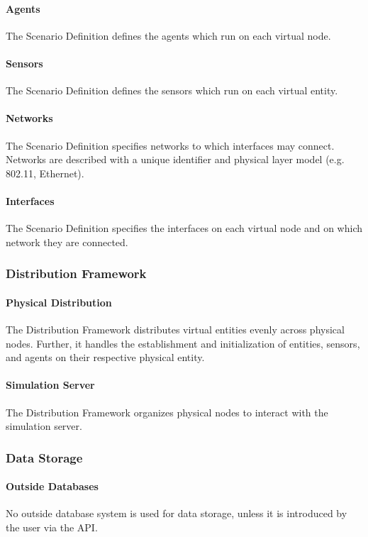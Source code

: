 \documentclass[titlepage]{article}
\begin{document}
    \paragraph{Agents} The Scenario Definition defines the agents which run on each virtual node.
    \paragraph{Sensors} The Scenario Definition defines the sensors which run on each virtual entity.
	\paragraph{Networks} The Scenario Definition specifies networks to which interfaces may connect.  Networks are described with a unique identifier and physical layer model (e.g. 802.11, Ethernet).
	\paragraph{Interfaces} The Scenario Definition specifies the interfaces on each virtual node and on which network they are connected.

\subsubsection{Distribution Framework}
	\paragraph{Physical Distribution} The Distribution Framework distributes virtual entities evenly across physical nodes. Further, it handles the establishment and initialization of entities, sensors, and agents on their respective physical entity.
	\paragraph{Simulation Server} The Distribution Framework organizes physical nodes to interact with the simulation server.


\subsubsection{Data Storage%
  \label{data-storage}%
}
    \paragraph{Outside Databases} No outside database system is used for data storage, unless it is introduced by the user via the API.
\end{document}
